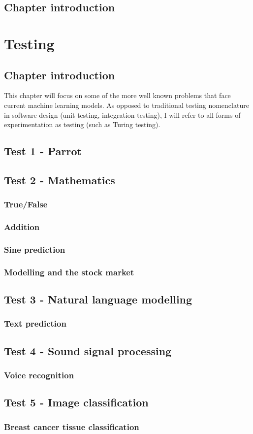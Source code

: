 \documentclass{book}
\begin{document}
\section{Chapter introduction}

\chapter{Testing}
\section{Chapter introduction}
This chapter will focus on some of the more well known problems that face current machine learning models. 
As opposed to traditional testing nomenclature in software design (unit testing, integration testing), I will refer to all forms of experimentation as testing (such as Turing testing).
\section{Test 1 - Parrot}
\section{Test 2 - Mathematics}
\subsection{True/False}
\subsection{Addition}
\subsection{Sine prediction}
\subsection{Modelling and the stock market}
\section{Test 3 - Natural language modelling}
\subsection{Text prediction}
\section{Test 4 - Sound signal processing}
\subsection{Voice recognition}
\section{Test 5 - Image classification}
\subsection{Breast cancer tissue classification}

\backmatter

\end{document}
